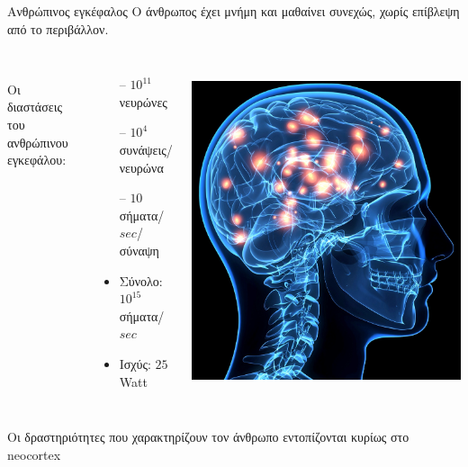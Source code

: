 \documentclass[11pt,center]{beamer}
\begin{document}
\begin{frame}{Ανθρώπινος εγκέφαλος}
  O άνθρωπος έχει \alert{μνήμη} και μαθαίνει \alert{συνεχώς}, χωρίς επίβλεψη από το περιβάλλον.

  \pause
  \begin{columns}
    \\ Οι διαστάσεις του ανθρώπινου εγκεφάλου:
    \small{
      \begin{itemize}
        \item[--] $10^{11}$ νευρώνες
        \item[--] $10^4$ συνάψεις/νευρώνα
        \item[--] $10$ σήματα/$sec$/σύναψη
          \vspace{+0.5em}
        \item Σύνολο: $10^{15}$ σήματα/$sec$
        \item Ισχύς: $25$ Watt
      \end{itemize}
    }
    \\
    \includegraphics[width=1\textwidth]{../pics/brain.jpeg}
  \end{columns}

  \pause
  \begin{block}{}
    Οι δραστηριότητες που χαρακτηρίζουν τον άνθρωπο εντοπίζονται κυρίως στο \alert{neocortex}
  \end{block}
\end{frame}
\end{document}
